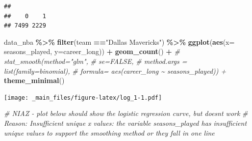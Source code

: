 \documentclass[
]{book}
\newenvironment{Shaded}{\begin{snugshade}}{\end{snugshade}}
\newcommand{\AttributeTok}[1]{\textcolor[rgb]{0.13,0.29,0.53}{#1}}
\newcommand{\CommentTok}[1]{\textcolor[rgb]{0.56,0.35,0.01}{\textit{#1}}}
\newcommand{\ConstantTok}[1]{\textcolor[rgb]{0.56,0.35,0.01}{#1}}
\newcommand{\DecValTok}[1]{\textcolor[rgb]{0.00,0.00,0.81}{#1}}
\newcommand{\FunctionTok}[1]{\textcolor[rgb]{0.13,0.29,0.53}{\textbf{#1}}}
\newcommand{\NormalTok}[1]{#1}
\newcommand{\OtherTok}[1]{\textcolor[rgb]{0.56,0.35,0.01}{#1}}
\newcommand{\SpecialCharTok}[1]{\textcolor[rgb]{0.81,0.36,0.00}{\textbf{#1}}}
\newcommand{\StringTok}[1]{\textcolor[rgb]{0.31,0.60,0.02}{#1}}
\begin{document}
\begin{Shaded}
\end{Shaded}

\begin{verbatim}
## 
##    0    1 
## 7499 2229
\end{verbatim}

\begin{Shaded}
\begin{Highlighting}[]
\NormalTok{data\_nba }\SpecialCharTok{\%\textgreater{}\%}
  \FunctionTok{filter}\NormalTok{(team }\SpecialCharTok{==}\StringTok{"Dallas Mavericks"}\NormalTok{) }\SpecialCharTok{\%\textgreater{}\%}
  \FunctionTok{ggplot}\NormalTok{(}\FunctionTok{aes}\NormalTok{(}\AttributeTok{x=}\NormalTok{ seasons\_played, }\AttributeTok{y=}\NormalTok{career\_long)) }\SpecialCharTok{+}
  \FunctionTok{geom\_count}\NormalTok{() }\SpecialCharTok{+}
  \CommentTok{\# stat\_smooth(method="glm",}
  \CommentTok{\#              se=FALSE, }
  \CommentTok{\#              method.args = list(family=binomial),}
  \CommentTok{\#              formula= aes(career\_long \textasciitilde{} seasons\_played)) +}
  \FunctionTok{theme\_minimal}\NormalTok{()}
\end{Highlighting}
\end{Shaded}

\texttt{[image: \_main\_files/figure-latex/log\_1-1.pdf]}

\begin{Shaded}
\begin{Highlighting}[]
\CommentTok{\# NIAZ {-} plot below should show the logistic regression curve, but doesnt work}
\CommentTok{\# Reason: Insufficient unique x values: the variable seasons\_played has insufficient unique values to support the smoothing method or they fall in one line}
\end{Highlighting}
\end{Shaded}
\end{document}
